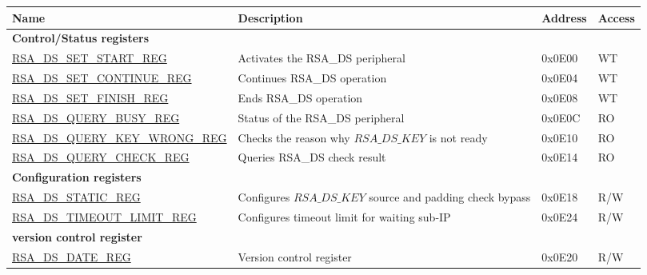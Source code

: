 \begin{longtable}{ | p{6cm} | p{7.2cm} | p{1.3cm} | p{1cm} | }
\hline\rowcolor{lightgray}
\textbf{Name} & \textbf{Description} &  \textbf{Address} & \textbf{Access} \\ \hline
\endhead
\multicolumn{4}{|l|}{\textbf{Control/Status registers}} \\ \hline
\hyperref[regdesc:RSADSSETSTARTREG]{RSA\_DS\_SET\_START\_REG} & Activates the RSA\_DS peripheral & 0x0E00 & WT \\ \hline
\hyperref[regdesc:RSADSSETCONTINUEREG]{RSA\_DS\_SET\_CONTINUE\_REG} & Continues RSA\_DS operation & 0x0E04 & WT \\ \hline
\hyperref[regdesc:RSADSSETFINISHREG]{RSA\_DS\_SET\_FINISH\_REG} & Ends RSA\_DS operation & 0x0E08 & WT \\ \hline
\hyperref[regdesc:RSADSQUERYBUSYREG]{RSA\_DS\_QUERY\_BUSY\_REG} & Status of the RSA\_DS peripheral & 0x0E0C & RO \\ \hline
\hyperref[regdesc:RSADSQUERYKEYWRONGREG]{RSA\_DS\_QUERY\_KEY\_WRONG\_REG} & Checks the reason why \begin{math}RSA\_DS\_KEY\end{math} is not ready & 0x0E10 & RO \\ \hline
\hyperref[regdesc:RSADSQUERYCHECKREG]{RSA\_DS\_QUERY\_CHECK\_REG} & Queries RSA\_DS check result & 0x0E14 & RO \\ \hline
\multicolumn{4}{|l|}{\textbf{Configuration registers}} \\ \hline
\hyperref[regdesc:RSADSSTATICREG]{RSA\_DS\_STATIC\_REG} & Configures \begin{math}RSA\_DS\_KEY\end{math} source and padding check bypass & 0x0E18 & R/W \\ \hline
\hyperref[regdesc:RSADSTIMEOUTLIMITREG]{RSA\_DS\_TIMEOUT\_LIMIT\_REG} & Configures timeout limit for waiting sub-IP & 0x0E24 & R/W \\ \hline
\multicolumn{4}{|l|}{\textbf{version control register}} \\ \hline
\hyperref[regdesc:RSADSDATEREG]{RSA\_DS\_DATE\_REG} & Version control register & 0x0E20 & R/W \\ \hline
\end{longtable}
